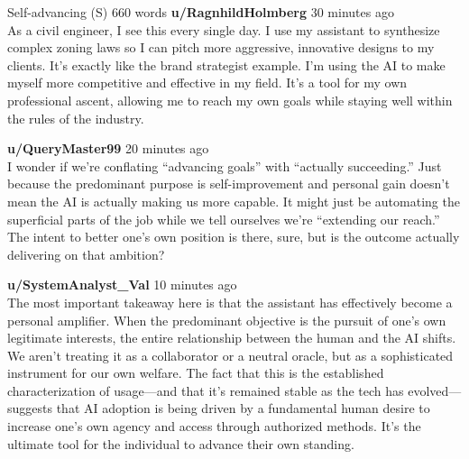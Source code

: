 \begin{corpusdoc}[SPyellow]{Self-advancing (S) \hfill 660 words}
\textbf{u/RagnhildHolmberg} \textbullet{} 30 minutes ago\\
As a civil engineer, I see this every single day. I use my assistant to synthesize complex zoning laws so I can pitch more aggressive, innovative designs to my clients. It's exactly like the brand strategist example. I'm using the AI to make myself more competitive and effective in my field. It's a tool for my own professional ascent, allowing me to reach my own goals while staying well within the rules of the industry.

\textbf{u/QueryMaster99} \textbullet{} 20 minutes ago\\
I wonder if we're conflating ``advancing goals'' with ``actually succeeding.'' Just because the predominant purpose is self-improvement and personal gain doesn't mean the AI is actually making us more capable. It might just be automating the superficial parts of the job while we tell ourselves we're ``extending our reach.'' The intent to better one's own position is there, sure, but is the outcome actually delivering on that ambition?

\textbf{u/SystemAnalyst\_Val} \textbullet{} 10 minutes ago\\
The most important takeaway here is that the assistant has effectively become a personal amplifier. When the predominant objective is the pursuit of one's own legitimate interests, the entire relationship between the human and the AI shifts. We aren't treating it as a collaborator or a neutral oracle, but as a sophisticated instrument for our own welfare. The fact that this is the established characterization of usage---and that it's remained stable as the tech has evolved---suggests that AI adoption is being driven by a fundamental human desire to increase one's own agency and access through authorized methods. It's the ultimate tool for the individual to advance their own standing.
\end{corpusdoc}

